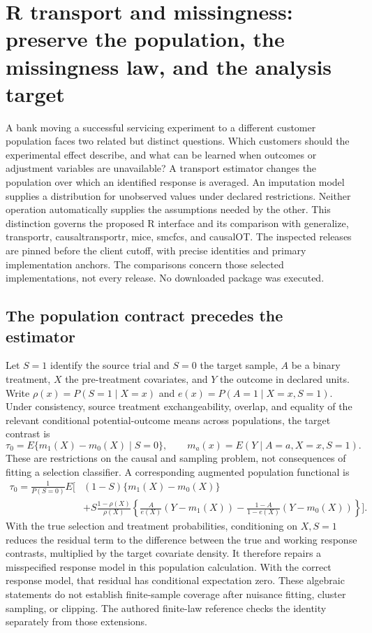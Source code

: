 \section[R transport and missingness contracts]{R transport and missingness: preserve the population, the missingness law, and the analysis target}
\label{sec:exec25-rtm}

A bank moving a successful servicing experiment to a different customer population faces two related but distinct questions. Which customers should the experimental effect describe, and what can be learned when outcomes or adjustment variables are unavailable? A transport estimator changes the population over which an identified response is averaged. An imputation model supplies a distribution for unobserved values under declared restrictions. Neither operation automatically supplies the assumptions needed by the other. This distinction governs the proposed R interface and its comparison with generalize, transportr, causaltransportr, mice, smcfcs, and causalOT. The inspected releases are pinned before the client cutoff, with precise identities and primary implementation anchors. The comparisons concern those selected implementations, not every release. No downloaded package was executed.\citep{exec25_rtm_generalize,exec25_rtm_transportr,exec25_rtm_causaltransportr,exec25_rtm_mice,exec25_rtm_smcfcs,exec25_rtm_causalOT}

\subsection{The population contract precedes the estimator}

Let $S=1$ identify the source trial and $S=0$ the target sample, $A$ be a binary treatment, $X$ the pre-treatment covariates, and $Y$ the outcome in declared units. Write $\rho(x)=P(S=1\mid X=x)$ and $e(x)=P(A=1\mid X=x,S=1)$. Under consistency, source treatment exchangeability, overlap, and equality of the relevant conditional potential-outcome means across populations, the target contrast is
\[
 \tau_0=E\{m_1(X)-m_0(X)\mid S=0\},\qquad
 m_a(x)=E(Y\mid A=a,X=x,S=1).
\]
These are restrictions on the causal and sampling problem, not consequences of fitting a selection classifier. A corresponding augmented population functional is
\begin{align*}
 \tau_0=\frac{1}{P(S=0)}E\bigg[&(1-S)\{m_1(X)-m_0(X)\}\\
 &+S\frac{1-\rho(X)}{\rho(X)}
 \left\{\frac{A}{e(X)}(Y-m_1(X))
       -\frac{1-A}{1-e(X)}(Y-m_0(X))\right\}\bigg].
\end{align*}
With the true selection and treatment probabilities, conditioning on $X,S=1$ reduces the residual term to the difference between the true and working response contrasts, multiplied by the target covariate density. It therefore repairs a misspecified response model in this population calculation. With the correct response model, that residual has conditional expectation zero. These algebraic statements do not establish finite-sample coverage after nuisance fitting, cluster sampling, or clipping. The authored finite-law reference checks the identity separately from those extensions.\citep{exec25_rtm_choice}

